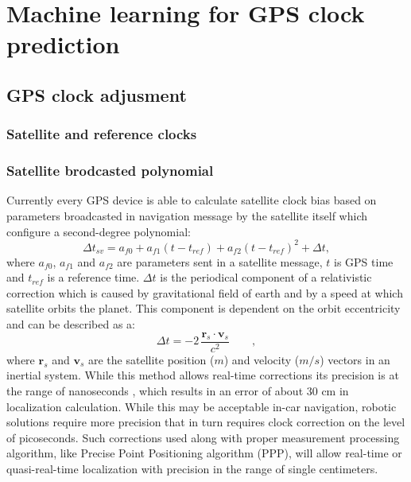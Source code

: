 \chapter{Machine learning for GPS clock prediction}


\section{GPS clock adjusment}

\subsection{Satellite and reference clocks}

\subsection{Satellite brodcasted polynomial}
Currently every GPS device is able to calculate satellite clock bias based on
parameters broadcasted in navigation message by the satellite itself which 
configure a second-degree polynomial:
\begin{equation}
	\Delta t_{sv}=a_{f0}+a_{f1}(t-t_{ref})+a_{f2}(t-t_{ref})^2+\Delta t,
\end{equation}
where $a_{f0}$, $a_{f1}$ and $a_{f2}$ are parameters sent in a satellite message, $t$ is GPS
time and $t_{ref}$ is a reference time. 
$\Delta t$ is the periodical component of a relativistic correction which is caused by 
gravitational field of earth and by a speed at which satellite orbits the planet.
This component is dependent on the orbit eccentricity and can be described as a:
\begin{equation}
 \Delta t=- 2\, \frac{\mathbf{r}_s \cdot \mathbf{v}_s}{c^2} \qquad,
\end{equation}
where $ {\mathbf r}_s$ and ${\mathbf v}_s$ are the satellite 
position ($\displaystyle m$) and velocity ($\displaystyle m/s$) vectors in an inertial system. 
While this method allows real-time corrections its precision is at the range of
nanoseconds \cite{Misra2011}, which results in an error of about 30 cm in localization calculation.
While this may be acceptable in-car navigation, robotic solutions require more precision that in
turn requires clock correction on the level of picoseconds.
Such corrections used along with proper measurement processing algorithm,
like Precise Point Positioning algorithm (PPP), will allow real-time or quasi-real-time localization with 
precision in the range of single centimeters\cite{krzan2015}.

